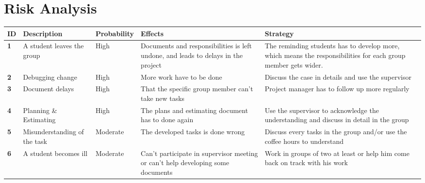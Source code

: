 \renewcommand{\headrulewidth}{0.1pt}
\renewcommand{\footrulewidth}{0.1pt}

\section*{Risk Analysis}



\begin{center}
	\def\arraystretch{1.5}%
    \begin{tabular}{ | l | p{4cm} | l | p{4cm} | p{4cm} |}
    \hline
    	\textbf{ID} & \textbf{Description} & \textbf{Probability} & \textbf{Effects} & \textbf{Strategy} \\ \hline
		
		\textbf{1} & A student leaves the group & High & Documents and responsibilities is left undone, and leads to delays in the project & The reminding students has to develop more, which means the responsibilities for each group member gets wider. \\ \hline
		
		\textbf{2} & Debugging change & High & More work have to be done & Discuss the case in details and use the supervisor \\ \hline
		
		\textbf{3} & Document delays & High & That the specific group member can’t take new tasks & Project manager has to follow up more regularly \\ \hline
		
		\textbf{4} & Planning \& Estimating & High & The plans and estimating document has to done again & Use the supervisor to acknowledge the understanding and discuss in detail in the group \\ \hline
		
		\textbf{5} & Misunderstanding of the task & Moderate & The developed tasks is done wrong & Discuss every tasks in the group and/or use the coffee hours to understand \\ \hline
		
		\textbf{6} & A student becomes ill  & Moderate & Can’t participate in supervisor meeting or can’t help developing some documents & Work in groups of two at least or help him come back on track with his work \\ \hline
		

\end{tabular}
\end{center}
